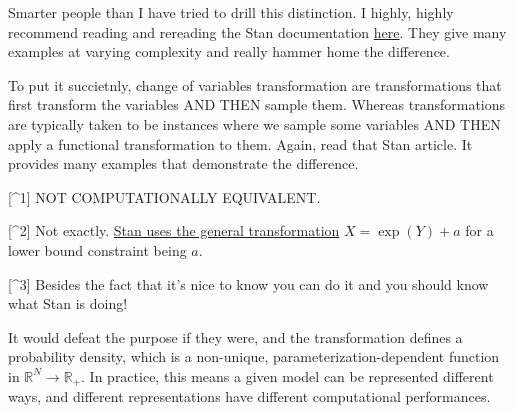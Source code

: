 \documentclass[
  letterpaper,
  DIV=11,
  numbers=noendperiod]{scrartcl}
\begin{document}
Smarter people than I have tried to drill this distinction. I highly,
highly recommend reading and rereading the Stan documentation
\href{https://mc-stan.org/docs/stan-users-guide/reparameterization.html\#change-of-variables.chapter}{here}.
They give many examples at varying complexity and really hammer home the
difference.

To put it succietnly, change of variables transformation are
transformations that first transform the variables AND THEN sample them.
Whereas transformations are typically taken to be instances where we
sample some variables AND THEN apply a functional transformation to
them. Again, read that Stan article. It provides many examples that
demonstrate the difference.

{[}\^{}1{]} NOT COMPUTATIONALLY EQUIVALENT.

{[}\^{}2{]} Not exactly.
\href{https://mc-stan.org/docs/reference-manual/transforms.html\#lower-bound-transform.section}{Stan
uses the general transformation} \(X = \exp(Y) + a\) for a lower bound
constraint being \(a\).

{[}\^{}3{]} Besides the fact that it's nice to know you can do it and
you should know what Stan is doing!

It would defeat the purpose if they were, and the transformation defines
a probability density, which is a non-unique, parameterization-dependent
function in \(\mathbb{R}^N \to \mathbb{R}_+\). In practice, this means a
given model can be represented different ways, and different
representations have different computational performances.
\end{document}
